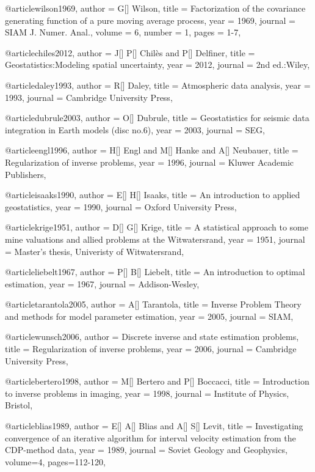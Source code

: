 {@article{wilson1969,
  author =	 {G[] Wilson},
  title =	 {Factorization of the covariance generating function of a pure moving average process},
  year =	 1969,
  journal =	 {SIAM J. Numer. Anal.},
  volume =	 6,
  number =	 1,
  pages =	 {1-7},
}

@article{chiles2012,
  author =	 {J[] P[] Chil\`{e}s and P[] Delfiner},
  title =	 {Geostatistics:Modeling spatial uncertainty},
  year =	 2012,
  journal =	 {2nd ed.:Wiley},
}

@article{daley1993,
  author =	 {R[] Daley},
  title =	 {Atmospheric data analysis},
  year =	 1993,
  journal =	 {Cambridge University Press},
}

@article{dubrule2003,
  author =	 {O[] Dubrule},
  title =	 {Geostatistics for seismic data integration in Earth models (disc no.6)},
  year =	 2003,
  journal =	 {SEG},
}

@article{engl1996,
  author =	 {H[] Engl and M[] Hanke and A[] Neubauer},
  title =	 {Regularization of inverse problems},
  year =	 1996,
  journal =	 {Kluwer Academic Publishers},
}

@article{isaaks1990,
  author =	 {E[] H[] Isaaks},
  title =	 {An introduction to applied geostatistics},
  year =	 1990,
  journal =	 {Oxford University Press},
}

@article{krige1951,
  author =	 {D[] G[] Krige},
  title =	 {A statistical approach to some mine valuations and allied problems at the Witwatersrand},
  year =	 1951,
  journal =	 {Master's thesis, Univeristy of Witwatersrand},
}

@article{liebelt1967,
  author =	 {P[] B[] Liebelt},
  title =	 {An introduction to optimal estimation},
  year =	 1967,
  journal =	 {Addison-Wesley},
}

@article{tarantola2005,
  author =	 {A[] Tarantola},
  title =	 {Inverse Problem Theory and methods for model parameter estimation},
  year =	 2005,
  journal =	 {SIAM},
}

@article{wunsch2006,
  author =	 {Discrete inverse and state estimation problems},
  title =	 {Regularization of inverse problems},
  year =	 2006,
  journal =	 {Cambridge University Press},
}


@article{bertero1998,
  author =	 {M[] Bertero and P[] Boccacci},
  title =	 {Introduction to inverse problems in imaging},
  year =	 1998,
  journal =	 {Institute of Physics, Bristol},
}

@article{blias1989,
  author =	 {E[] A[] Blias and A[] S[] Levit},
  title =	 {Investigating convergence of an iterative algorithm for interval velocity estimation from the CDP-method data},
  year =	 1989,
  journal =	 {Soviet Geology and Geophysics},
  volume={4},
 pages=112-120,
}


}
